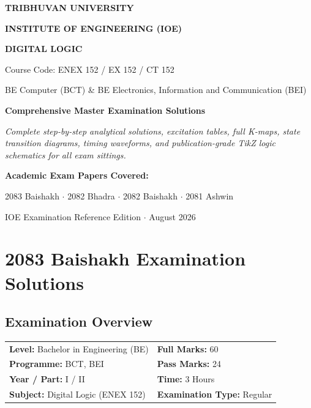 \documentclass[11pt,a4paper,oneside]{book}
\begin{document}
\begin{titlepage}
  \centering
  \vspace*{1.5cm}
  {\Huge \bfseries \color{primarydark} TRIBHUVAN UNIVERSITY\par}
  \vspace{0.4cm}
  {\Large \bfseries \color{secondaryblue} INSTITUTE OF ENGINEERING (IOE)\par}
  \vspace{1.5cm}
  {\Huge \bfseries \color{accentteal} DIGITAL LOGIC\par}
  \vspace{0.5cm}
  {\LARGE Course Code: ENEX 152 / EX 152 / CT 152\par}
  \vspace{0.3cm}
  {\large BE Computer (BCT) \& BE Electronics, Information and Communication (BEI)\par}
  \vspace{2.0cm}
  
  \begin{tcolorbox}[colback=boxbg,colframe=alertborder,width=0.88\textwidth,arc=3mm,center]
    \centering
    \Large \textbf{Comprehensive Master Examination Solutions}\par
    \vspace{0.3cm}
    \normalsize \textit{Complete step-by-step analytical solutions, excitation tables, full K-maps, state transition diagrams, timing waveforms, and publication-grade TikZ logic schematics for all exam sittings.}
  \end{tcolorbox}
  
  \vfill
  {\large \textbf{Academic Exam Papers Covered:}\par}
  {\normalsize 2083 Baishakh $\cdot$ 2082 Bhadra $\cdot$ 2082 Baishakh $\cdot$ 2081 Ashwin\par}
  \vspace{1.0cm}
  {\small IOE Examination Reference Edition $\cdot$ August 2026\par}
\end{titlepage}

\tableofcontents
\newpage

\chapter{2083 Baishakh Examination Solutions}

\section*{Examination Overview}
\begin{tabular}{@{}ll@{}}
\textbf{Level:} Bachelor in Engineering (BE) & \textbf{Full Marks:} 60 \\
\textbf{Programme:} BCT, BEI & \textbf{Pass Marks:} 24 \\
\textbf{Year / Part:} I / II & \textbf{Time:} 3 Hours \\
\textbf{Subject:} Digital Logic (ENEX 152) & \textbf{Examination Type:} Regular \\
\end{tabular}
\end{document}
